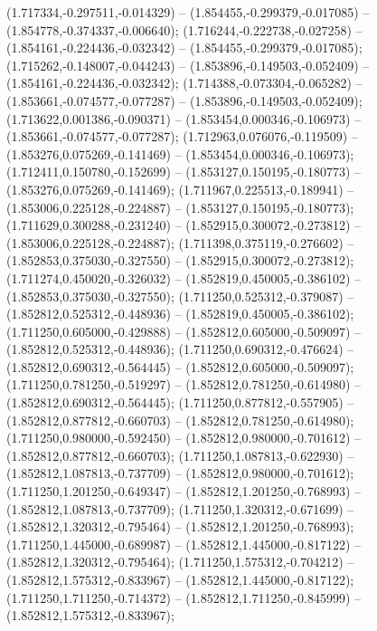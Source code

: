  (1.717334,-0.297511,-0.014329) -- (1.854455,-0.299379,-0.017085) -- (1.854778,-0.374337,-0.006640);
 (1.716244,-0.222738,-0.027258) -- (1.854161,-0.224436,-0.032342) -- (1.854455,-0.299379,-0.017085);
 (1.715262,-0.148007,-0.044243) -- (1.853896,-0.149503,-0.052409) -- (1.854161,-0.224436,-0.032342);
 (1.714388,-0.073304,-0.065282) -- (1.853661,-0.074577,-0.077287) -- (1.853896,-0.149503,-0.052409);
 (1.713622,0.001386,-0.090371) -- (1.853454,0.000346,-0.106973) -- (1.853661,-0.074577,-0.077287);
 (1.712963,0.076076,-0.119509) -- (1.853276,0.075269,-0.141469) -- (1.853454,0.000346,-0.106973);
 (1.712411,0.150780,-0.152699) -- (1.853127,0.150195,-0.180773) -- (1.853276,0.075269,-0.141469);
 (1.711967,0.225513,-0.189941) -- (1.853006,0.225128,-0.224887) -- (1.853127,0.150195,-0.180773);
 (1.711629,0.300288,-0.231240) -- (1.852915,0.300072,-0.273812) -- (1.853006,0.225128,-0.224887);
 (1.711398,0.375119,-0.276602) -- (1.852853,0.375030,-0.327550) -- (1.852915,0.300072,-0.273812);
 (1.711274,0.450020,-0.326032) -- (1.852819,0.450005,-0.386102) -- (1.852853,0.375030,-0.327550);
 (1.711250,0.525312,-0.379087) -- (1.852812,0.525312,-0.448936) -- (1.852819,0.450005,-0.386102);
 (1.711250,0.605000,-0.429888) -- (1.852812,0.605000,-0.509097) -- (1.852812,0.525312,-0.448936);
 (1.711250,0.690312,-0.476624) -- (1.852812,0.690312,-0.564445) -- (1.852812,0.605000,-0.509097);
 (1.711250,0.781250,-0.519297) -- (1.852812,0.781250,-0.614980) -- (1.852812,0.690312,-0.564445);
 (1.711250,0.877812,-0.557905) -- (1.852812,0.877812,-0.660703) -- (1.852812,0.781250,-0.614980);
 (1.711250,0.980000,-0.592450) -- (1.852812,0.980000,-0.701612) -- (1.852812,0.877812,-0.660703);
 (1.711250,1.087813,-0.622930) -- (1.852812,1.087813,-0.737709) -- (1.852812,0.980000,-0.701612);
 (1.711250,1.201250,-0.649347) -- (1.852812,1.201250,-0.768993) -- (1.852812,1.087813,-0.737709);
 (1.711250,1.320312,-0.671699) -- (1.852812,1.320312,-0.795464) -- (1.852812,1.201250,-0.768993);
 (1.711250,1.445000,-0.689987) -- (1.852812,1.445000,-0.817122) -- (1.852812,1.320312,-0.795464);
 (1.711250,1.575312,-0.704212) -- (1.852812,1.575312,-0.833967) -- (1.852812,1.445000,-0.817122);
 (1.711250,1.711250,-0.714372) -- (1.852812,1.711250,-0.845999) -- (1.852812,1.575312,-0.833967);

